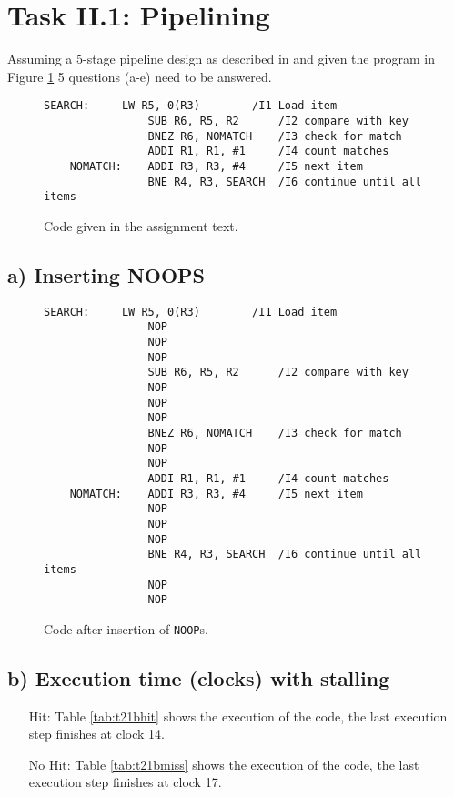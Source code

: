 \section{Task II.1: Pipelining}

Assuming a 5-stage pipeline design as described in \cite{l3InOrder} and given
the program in Figure \ref{fig:t21code} 5 questions (a-e) need to be answered.

\begin{figure}[ht]
    \begin{lstlisting}[language={[x86masm]Assembler}]
    SEARCH:     LW R5, 0(R3)        /I1 Load item
                SUB R6, R5, R2      /I2 compare with key
                BNEZ R6, NOMATCH    /I3 check for match
                ADDI R1, R1, #1     /I4 count matches
    NOMATCH:    ADDI R3, R3, #4     /I5 next item
                BNE R4, R3, SEARCH  /I6 continue until all items
    \end{lstlisting}
    \caption{Code given in the assignment text.}
    \label{fig:t21code}
\end{figure}

\subsection{a) Inserting NOOPS}

\begin{figure}[ht]
    \begin{lstlisting}[language={[x86masm]Assembler}]
    SEARCH:     LW R5, 0(R3)        /I1 Load item
                NOP
                NOP
                NOP
                SUB R6, R5, R2      /I2 compare with key
                NOP
                NOP
                NOP
                BNEZ R6, NOMATCH    /I3 check for match
                NOP
                NOP
                ADDI R1, R1, #1     /I4 count matches
    NOMATCH:    ADDI R3, R3, #4     /I5 next item
                NOP
                NOP
                NOP
                BNE R4, R3, SEARCH  /I6 continue until all items
                NOP
                NOP
    \end{lstlisting}
    \caption{Code after insertion of \texttt{NOOP}s.}
    \label{fig:t21a}
\end{figure}

\subsection{b) Execution time (clocks) with stalling}
\begin{itemize}
    \item[Hit: ] Table \ref{tab:t21bhit} shows  the execution of the code, the
    last execution step finishes at clock 14.

    \item[No Hit: ] Table \ref{tab:t21bmiss} shows  the execution of the code, the
    last execution step finishes at clock 17.
\end{itemize}


